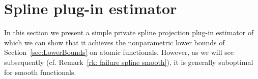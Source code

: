 \documentclass[preprint]{imsart}
\numberwithin{equation}{section}
\begin{document}
%



\section{Spline plug-in estimator}
\label{sec:SplineEst}

In this section we present a simple private spline projection plug-in estimator of which we can show that it achieves the nonparametric lower bounds of Section~\ref{sec:LowerBounds} on atomic functionals. However, as we will see subsequently (cf. Remark~\ref{rk: failure spline smooth}), it is generally suboptimal for smooth functionals.
\end{document}
